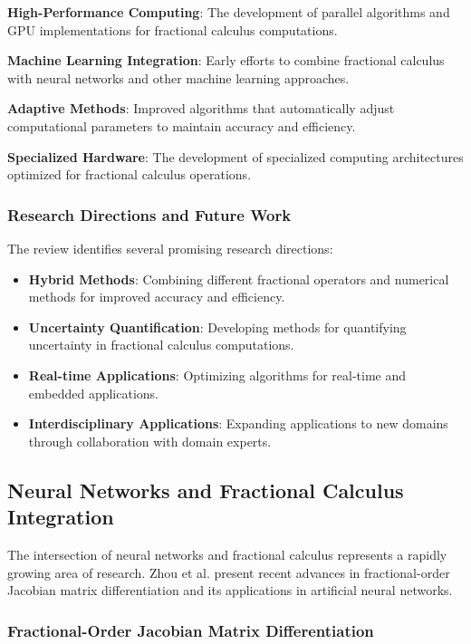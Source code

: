 \textbf{High-Performance Computing}: The development of parallel algorithms and GPU implementations for fractional calculus computations.

\textbf{Machine Learning Integration}: Early efforts to combine fractional calculus with neural networks and other machine learning approaches.

\textbf{Adaptive Methods}: Improved algorithms that automatically adjust computational parameters to maintain accuracy and efficiency.

\textbf{Specialized Hardware}: The development of specialized computing architectures optimized for fractional calculus operations.

\subsubsection{Research Directions and Future Work}

The review identifies several promising research directions:

\begin{itemize}
    \item \textbf{Hybrid Methods}: Combining different fractional operators and numerical methods for improved accuracy and efficiency.
    \item \textbf{Uncertainty Quantification}: Developing methods for quantifying uncertainty in fractional calculus computations.
    \item \textbf{Real-time Applications}: Optimizing algorithms for real-time and embedded applications.
    \item \textbf{Interdisciplinary Applications}: Expanding applications to new domains through collaboration with domain experts.
\end{itemize}

\subsection{Neural Networks and Fractional Calculus Integration}

The intersection of neural networks and fractional calculus represents a rapidly growing area of research. Zhou et al. \cite{Zhou2025FractionalOrderJacobianANN} present recent advances in fractional-order Jacobian matrix differentiation and its applications in artificial neural networks.

\subsubsection{Fractional-Order Jacobian Matrix Differentiation}

